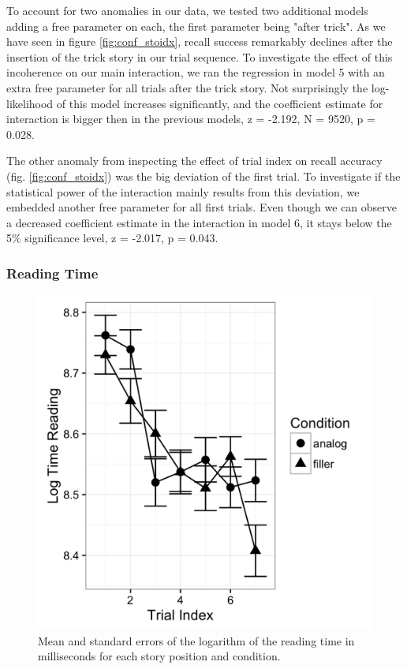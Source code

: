 \documentclass[a4paper,man,natbib,floatsintext,import]{apa6}
\begin{document}
\begin{landscape}

\end{landscape}

To account for two anomalies in our data, we tested two additional models adding a free parameter on each, the first parameter being "after trick". As we have seen in figure \ref{fig:conf_stoidx}, recall success remarkably declines after the insertion of the trick story in our trial sequence. To investigate the effect of this incoherence on our main interaction, we ran the regression in model 5 with an extra free parameter for all trials after the trick story. Not surprisingly the log-likelihood of this model increases significantly, and the coefficient estimate for interaction is bigger then in the previous models, z = -2.192, N = 9520, p = 0.028.

The other anomaly from inspecting the effect of trial index on recall accuracy (fig. \ref{fig:conf_stoidx}) was the big deviation of the first trial. To investigate if the statistical power of the interaction mainly results from this deviation, we embedded another free parameter for all first trials. Even though we can observe a decreased coefficient estimate in the interaction in model 6, it stays below the 5\% significance level, z = -2.017, p = 0.043.

\subsubsection{Reading Time}

\begin{figure}
\centering
\begin{minipage}[t]{.5\textwidth}
\includegraphics[width=.9\linewidth]{figures/read.png}
\caption{Mean and standard errors of the logarithm of the reading time in milliseconds for each story position and condition.}
\label{fig:read}
\end{minipage}
\end{figure}
\end{document}
